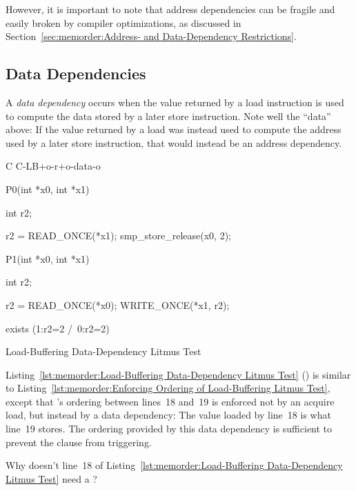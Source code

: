 However, it is important to note that address dependencies can
be fragile and easily broken by compiler optimizations, as discussed in
Section~\ref{sec:memorder:Address- and Data-Dependency Restrictions}.

\subsection{Data Dependencies}
\label{sec:memorder:Data Reordering}

A \emph{data dependency} occurs when the value returned by a load
instruction is used to compute the data stored by a later store
instruction.
Note well the ``data'' above: If the value returned by a load
was instead used to compute the address used by a later store
instruction, that would instead be an address dependency.

\begin{listing}[tbp]
{ \scriptsize
\begin{verbbox}[\LstLineNo]
C C-LB+o-r+o-data-o
{
}

P0(int *x0, int *x1)
{
  int r2;

  r2 = READ_ONCE(*x1);
  smp_store_release(x0, 2);
}


P1(int *x0, int *x1)
{
  int r2;

  r2 = READ_ONCE(*x0);
  WRITE_ONCE(*x1, r2);
}

exists (1:r2=2 /\ 0:r2=2)
\end{verbbox}
}
\centering
\theverbbox
\caption{Load-Buffering Data-Dependency Litmus Test}
\label{lst:memorder:Load-Buffering Data-Dependency Litmus Test}
\end{listing}

Listing~\ref{lst:memorder:Load-Buffering Data-Dependency Litmus Test}
()
is similar to
Listing~\ref{lst:memorder:Enforcing Ordering of Load-Buffering Litmus Test},
except that 's ordering between lines~18 and~19 is
enforced not by an acquire load, but instead by a data dependency:
The value loaded by line~18 is what line~19 stores.
The ordering provided by this data dependency is sufficient to prevent
the  clause from triggering.

\QuickQuiz{}
	Why doesn't line~18 of
	Listing~\ref{lst:memorder:Load-Buffering Data-Dependency Litmus Test}
	need a ?
 \QuickQuizEnd

